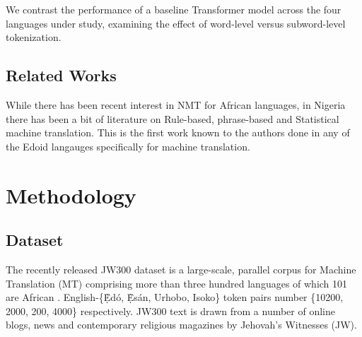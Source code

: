 \documentclass{article} %
\begin{document}
We contrast the performance of a baseline Transformer model across the four languages under study, examining the effect of word-level versus subword-level tokenization.






\subsection{Related Works}

While there has been recent interest in NMT for African languages, in Nigeria there has been a bit of literature on Rule-based, phrase-based and Statistical machine translation. This is the first work known to the authors done in any of the Edoid langauges specifically for machine translation.


\section{Methodology}
\label{methods}

\subsection{Dataset}
The recently released JW300 dataset is a large-scale, parallel corpus for Machine Translation (MT) comprising more than three hundred languages of which 101 are African \citep{agic-vulic-2019-jw300}. English-\{\d{\`E}d{\'o}, \d{\`E}s{\'a}n, Urhobo, Isoko\} token pairs number \{10200, 2000, 200, 4000\} respectively. JW300 text is drawn from a number of online blogs, news and contemporary religious magazines by Jehovah's Witnesses (JW).
\end{document}
